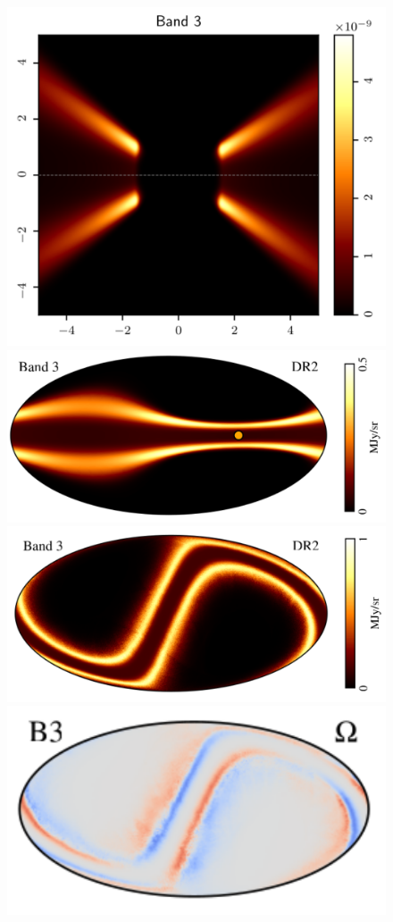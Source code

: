 \documentclass[twocolumn]{aa}
\begin{document}
\begin{figure}
  \includegraphics[width=0.95\columnwidth]{figs/band3_cut.pdf}\\
  \includegraphics[width=0.95\columnwidth]{figs/band3_instant.pdf}\\
  \includegraphics[width=0.95\columnwidth]{figs/band3_mission.pdf}\\
  \includegraphics[width=0.95\columnwidth]{figs/band3_omega.pdf}

\end{figure}
\end{document}

